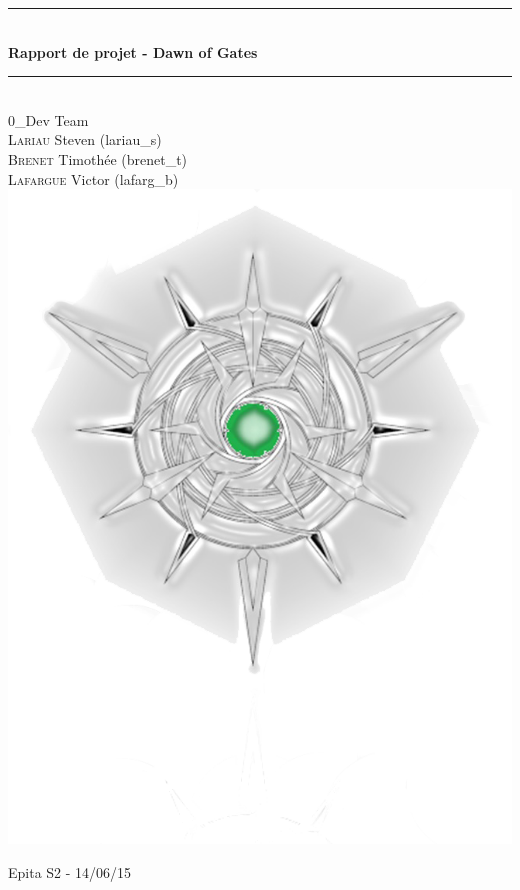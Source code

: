 \documentclass[12pt]{article}
\newcommand{\HRule}{\rule{\linewidth}{0.5mm}}
\begin{document}
\renewcommand{\figurename}{Illustration}
\renewcommand{\listfigurename}{Table des illustrations}

\renewcommand{\glossaryname}{Glossaire}

\begin{titlepage}
	\begin{center}

		\HRule \\[0.4cm]
		{ \huge \bfseries Rapport de projet - Dawn of Gates\\[0.4cm] }
		\HRule \\[2cm]


		\large \textsc 0\_Dev Team\\
		\textsc{Lariau} Steven (lariau\_s) \\
		\textsc{Brenet} Timothée (brenet\_t)\\
		\textsc{Lafargue} Victor (lafarg\_b)\\

		\includegraphics[scale=0.45]{logo2.png}
		
		\large \textsc Epita S2 - 14/06/15

	\end{center}
\end{titlepage}
\end{document}
